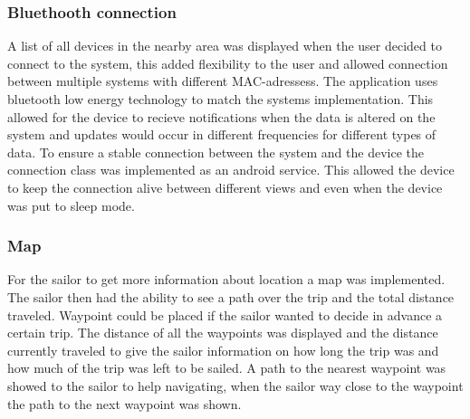 \subsubsection{Bluethooth connection}
A list of all devices in the nearby area was displayed when the user decided to connect to the system, this added flexibility to the user and allowed connection between multiple systems with different MAC-adressess. The application uses bluetooth low energy technology to match the systems implementation. This allowed for the device to recieve notifications when the data is altered on the system and updates would occur in different frequencies for different types of data. To ensure a stable connection between the system and the device the connection class was implemented as an android service\cite{android-service}. This allowed the device to keep the connection alive between different views and even when the device was put to sleep mode.

\subsubsection{Map}
For the sailor to get more information about location a map was implemented. The sailor then had the ability to see a path over the trip and the total distance traveled. Waypoint could be placed if the sailor wanted to decide in advance a certain trip. The distance of all the waypoints was displayed and the distance currently traveled to give the sailor information on how long the trip was and how much of the trip was left to be sailed. A path to the nearest waypoint was showed to the sailor to help navigating, when the sailor way close to the waypoint the path to the next waypoint was shown.

